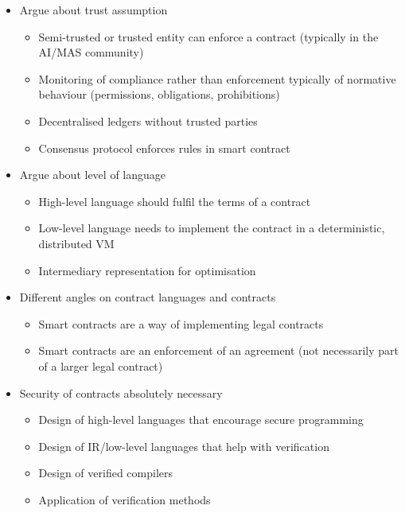 \documentclass{llncs}
\begin{document}
\begin{itemize}
\item Argue about trust assumption
\begin{itemize}
\item Semi-trusted or trusted entity can enforce a contract (typically in the AI/MAS community)
\item Monitoring of compliance rather than enforcement \cite{Kyas2008} typically of normative behaviour (permissions, obligations, prohibitions)
\item Decentralised ledgers without trusted parties \cite{Nakamoto2008,Buterin2013}
\item Consensus protocol enforces rules in smart contract
\end{itemize}
\item Argue about level of language
\begin{itemize}
\item High-level language should fulfil the terms of a contract
\item Low-level language needs to implement the contract in a deterministic, distributed VM \cite{BitcoinWiki2018Script}\cite{Wood2014}
\item Intermediary representation for optimisation
\end{itemize}
\item Different angles on contract languages and contracts
\begin{itemize}
\item Smart contracts are a way of implementing legal contracts \cite{Neal.2003,Governatori2006,Clack2016}
\item Smart contracts are an enforcement of an agreement (not necessarily part of a larger legal contract) \cite{Szabo1997,Nakamoto2008,Buterin2013}
\end{itemize}
\item Security of contracts absolutely necessary
\begin{itemize}
\item Design of high-level languages that encourage secure programming
\item Design of IR/low-level languages that help with verification
\item Design of verified compilers
\item Application of verification methods
\end{itemize}
\end{itemize}


\end{document}
